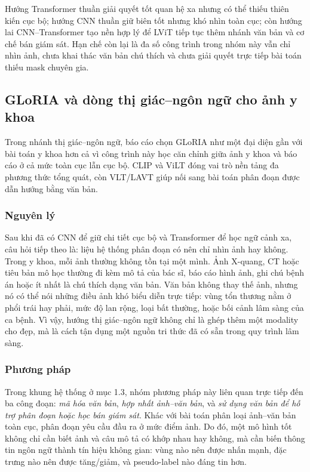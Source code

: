 Hướng Transformer thuần giải quyết tốt quan hệ xa nhưng có thể thiếu thiên kiến cục bộ; hướng CNN thuần giữ biên tốt nhưng khó nhìn toàn cục; còn hướng lai CNN--Transformer tạo nền hợp lý để LViT tiếp tục thêm nhánh văn bản và cơ chế bán giám sát. Hạn chế còn lại là đa số công trình trong nhóm này vẫn chỉ nhìn ảnh, chưa khai thác văn bản chú thích và chưa giải quyết trực tiếp bài toán thiếu mask chuyên gia.

\subsection{GLoRIA và dòng thị giác--ngôn ngữ cho ảnh y khoa}

Trong nhánh thị giác--ngôn ngữ, báo cáo chọn GLoRIA như một đại diện gần với bài toán y khoa hơn cả vì công trình này học căn chỉnh giữa ảnh y khoa và báo cáo ở cả mức toàn cục lẫn cục bộ. CLIP và ViLT đóng vai trò nền tảng đa phương thức tổng quát, còn VLT/LAVT giúp nối sang bài toán phân đoạn được dẫn hướng bằng văn bản.

\subsubsection{Nguyên lý}

Sau khi đã có CNN để giữ chi tiết cục bộ và Transformer để học ngữ cảnh xa, câu hỏi tiếp theo là: liệu hệ thống phân đoạn có nên chỉ nhìn ảnh hay không. Trong y khoa, mỗi ảnh thường không tồn tại một mình. Ảnh X-quang, CT hoặc tiêu bản mô học thường đi kèm mô tả của bác sĩ, báo cáo hình ảnh, ghi chú bệnh án hoặc ít nhất là chú thích dạng văn bản. Văn bản không thay thế ảnh, nhưng nó có thể nói những điều ảnh khó biểu diễn trực tiếp: vùng tổn thương nằm ở phổi trái hay phải, mức độ lan rộng, loại bất thường, hoặc bối cảnh lâm sàng của ca bệnh. Vì vậy, hướng thị giác--ngôn ngữ không chỉ là ghép thêm một modality cho đẹp, mà là cách tận dụng một nguồn tri thức đã có sẵn trong quy trình lâm sàng.

\subsubsection{Phương pháp}

Trong khung hệ thống ở mục 1.3, nhóm phương pháp này liên quan trực tiếp đến ba công đoạn: \textit{mã hóa văn bản}, \textit{hợp nhất ảnh--văn bản}, và \textit{sử dụng văn bản để hỗ trợ phân đoạn hoặc học bán giám sát}. Khác với bài toán phân loại ảnh--văn bản toàn cục, phân đoạn yêu cầu đầu ra ở mức điểm ảnh. Do đó, một mô hình tốt không chỉ cần biết ảnh và câu mô tả có khớp nhau hay không, mà cần biến thông tin ngôn ngữ thành tín hiệu không gian: vùng nào nên được nhấn mạnh, đặc trưng nào nên được tăng/giảm, và pseudo-label nào đáng tin hơn.

